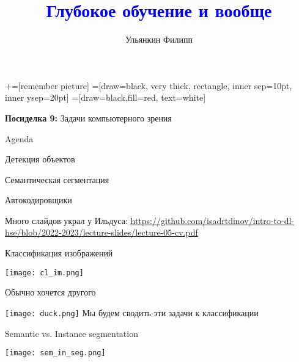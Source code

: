 \documentclass[notes,12pt, aspectratio=169]{beamer}
\title[]{\textcolor{blue}{Глубокое обучение и вообще}}
\author{Ульянкин Филипп}
\date{ }
\newenvironment{wideitemize}{\itemize\addtolength{\itemsep}{10pt}}{\enditemize}
\begin{document}
\newcommand\marktopleft[1]{%
    \tikz[overlay,remember picture] 
        \node (marker-#1-a) at (-.3em,.3em) {};%
}
\newcommand\markbottomright[2]{%
    \tikz[overlay,remember picture] 
        \node (marker-#1-b) at (0em,0em) {};%
}
+=[remember picture] 
 =[draw=black, very thick, rectangle, inner sep=10pt, inner ysep=20pt]
 =[draw=black,fill=red, text=white]

\begin{frame}
\maketitle
\centering \textbf{\color{blue} Посиделка 9:}  Задачи компьютерного зрения
\end{frame}


\begin{frame}{Agenda}
\begin{wideitemize}
	\item Детекция объектов
	\item Семантическая сегментация
	\item Автокодировщики
\end{wideitemize} 

\vfill
\footnotesize
Много слайдов украл у Ильдуса: {\color{blue} \url{https://github.com/isadrtdinov/intro-to-dl-hse/blob/2022-2023/lecture-slides/lecture-05-cv.pdf}}  \newline 
\end{frame}


\begin{frame}{Классификация изображений}
	\begin{center}
	\texttt{[image: cl\_im.png]}
\end{center}
\end{frame}


\begin{frame}{Обычно хочется другого}
	\begin{center}
		\texttt{[image: duck.png]}
		\vfill 
		{\Large \alert{Мы будем сводить эти задачи к классификации} }
	\end{center}
\end{frame}

\begin{frame}{ Semantic vs. Instance segmentation}
	\begin{center}
		\texttt{[image: sem\_in\_seg.png]}
	\end{center}
\end{frame}
\end{document}
